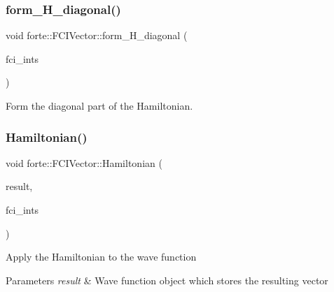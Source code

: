 \mbox{\label{classforte_1_1_f_c_i_vector_afdfc26aaf2b21ea6b5cfdec40c71cf22}} 
\subsubsection{\texorpdfstring{form\+\_\+\+H\+\_\+diagonal()}{form\_H\_diagonal()}}
{\footnotesize\ttfamily void forte\+::\+F\+C\+I\+Vector\+::form\+\_\+\+H\+\_\+diagonal (\begin{DoxyParamCaption}\item[{std\+::shared\+\_\+ptr$<$ \mbox{\hyperlink{classforte_1_1_active_space_integrals}{Active\+Space\+Integrals}} $>$}]{fci\+\_\+ints }\end{DoxyParamCaption})}



Form the diagonal part of the Hamiltonian. 

\mbox{\label{classforte_1_1_f_c_i_vector_a7fe418805ec6a6f43c7eea53a3f905a4}} 
\subsubsection{\texorpdfstring{Hamiltonian()}{Hamiltonian()}}
{\footnotesize\ttfamily void forte\+::\+F\+C\+I\+Vector\+::\+Hamiltonian (\begin{DoxyParamCaption}\item[{\mbox{\hyperlink{classforte_1_1_f_c_i_vector}{F\+C\+I\+Vector}} \&}]{result,  }\item[{std\+::shared\+\_\+ptr$<$ \mbox{\hyperlink{classforte_1_1_active_space_integrals}{Active\+Space\+Integrals}} $>$}]{fci\+\_\+ints }\end{DoxyParamCaption})}

Apply the Hamiltonian to the wave function 
\begin{DoxyParams}{Parameters}
{\em result} & Wave function object which stores the resulting vector \\
\hline
\end{DoxyParams}
\mbox{\label{classforte_1_1_f_c_i_vector_afee2d3025d99c222d84d9a0c8b3b236d}} 
